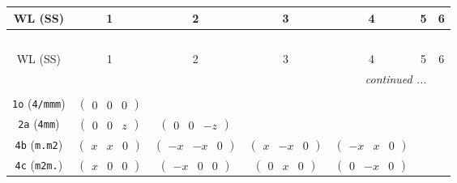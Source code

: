 \documentclass[fleqn,9pt,landscape]{jsarticle}
\begin{document}
\begin{center}
\renewcommand{\arraystretch}{1.2}
\begin{longtable}{ccccccc}
 \hline \hline
WL (SS) & 1 & 2 & 3 & 4 & 5 & 6 \\ \hline \endfirsthead

\multicolumn{6}{l}{\tablename\ \thetable{}} \\
 \hline \hline
WL (SS) & 1 & 2 & 3 & 4 & 5 & 6 \\ \hline \endhead

 \hline \hline
\multicolumn{6}{r}{\footnotesize\it continued ...} \\ \endfoot

 \hline \hline
\multicolumn{6}{r}{} \\ \endlastfoot

{\tt 1o} ({\tt 4/mmm}) & $ \begin{pmatrix} 0 & 0 & 0 \end{pmatrix} $ & $  $ & $  $ & $  $ & $  $ & $  $ \\ \hline
{\tt 2a} ({\tt 4mm}) & $ \begin{pmatrix} 0 & 0 & z \end{pmatrix} $ & $ \begin{pmatrix} 0 & 0 & - z \end{pmatrix} $ & $  $ & $  $ & $  $ & $  $ \\ \hline
{\tt 4b} ({\tt m.m2}) & $ \begin{pmatrix} x & x & 0 \end{pmatrix} $ & $ \begin{pmatrix} - x & - x & 0 \end{pmatrix} $ & $ \begin{pmatrix} x & - x & 0 \end{pmatrix} $ & $ \begin{pmatrix} - x & x & 0 \end{pmatrix} $ & $  $ & $  $ \\ \hline
{\tt 4c} ({\tt m2m.}) & $ \begin{pmatrix} x & 0 & 0 \end{pmatrix} $ & $ \begin{pmatrix} - x & 0 & 0 \end{pmatrix} $ & $ \begin{pmatrix} 0 & x & 0 \end{pmatrix} $ & $ \begin{pmatrix} 0 & - x & 0 \end{pmatrix} $ & $  $ & $  $ \\ \hline

\end{longtable}
\end{center}
\end{document}

